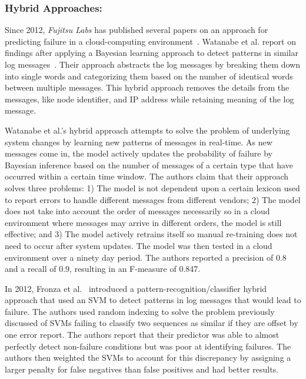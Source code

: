 \subsubsection{Hybrid Approaches:}
Since 2012, \emph{Fujitsu Labs} has published several papers on an approach for predicting failure in a cloud-computing environment~\cite{sonoda2012,watanabe2012,watanabe2014}.  Watanabe et al. report on findings after applying a Bayesian learning approach to detect patterns in similar log messages~\cite{watanabe2014, watanabe2012}.  Their approach abstracts the log messages by breaking them down into single words and categorizing them based on the number of identical words between multiple messages.  This hybrid approach removes the details from the messages, like node identifier, and IP address while retaining meaning of the log message.

Watanabe et al.'s hybrid approach attempts to solve the problem of underlying system changes by learning new patterns of messages in real-time.  As new messages come in, the model actively updates the probability of failure by Bayesian inference based on the number of messages of a certain type that have occurred within a certain time window.  The authors claim that their approach solves three problems: 1)  The model is not dependent upon a certain lexicon used to report errors to handle different messages from different vendors; 2)  The model does not take into account the order of messages necessarily so in a cloud environment where messages may arrive in different orders, the model is still effective; and 3)  The model actively retrains itself so manual re-training does not need to occur after system updates.  The model was then tested in a cloud environment over a ninety day period.  The authors reported a precision of 0.8 and a recall of 0.9, resulting in an F-measure of 0.847.  

In 2012, Fronza et al.~\cite{fronza2013} introduced a pattern-recognition/classifier hybrid approach that used an SVM to detect patterns in log messages that would lead to failure.  The authors used random indexing to solve the problem previously discussed of SVMs failing to classify two sequences as similar if they are offset by one error report.  The authors report that their predictor was able to almost perfectly detect non-failure conditions but was poor at identifying failures.  The authors then weighted the SVMs to account for this discrepancy by assigning a larger penalty for false negatives than false positives and had better results.
